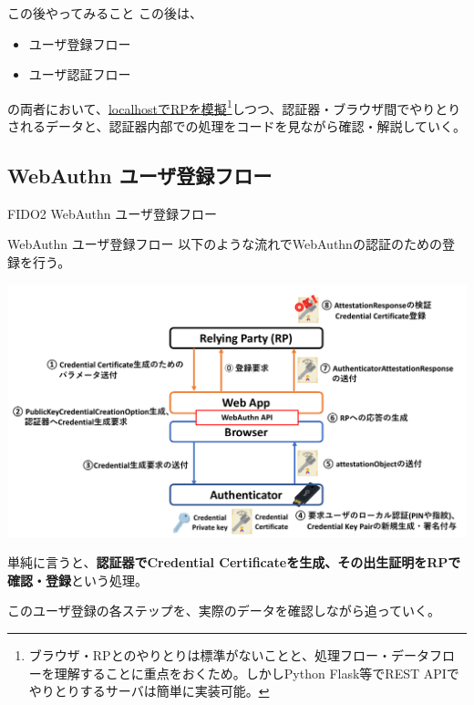\documentclass[12pt,dvipdfmx,uplatex]{beamer}
\begin{document}
\begin{frame}{この後やってみること}
\small
この後は、
\begin{itemize}
 \item ユーザ登録フロー 
 \item ユーザ認証フロー
\end{itemize}
の両者において、\ul{localhostでRPを模擬}\footnote[frame]{\scriptsize ブラウザ・RPとのやりとりは標準がないことと、処理フロー・データフローを理解することに重点をおくため。しかしPython Flask等でREST APIでやりとりするサーバは簡単に実装可能。}しつつ、認証器・ブラウザ間でやりとりされるデータと、認証器内部での処理をコードを見ながら確認・解説していく。
\end{frame}


\subsection{WebAuthn ユーザ登録フロー}

\begin{frame}
\centering
{\Large FIDO2 WebAuthn ユーザ登録フロー}
\end{frame}


\begin{frame}{WebAuthn ユーザ登録フロー}
以下のような流れでWebAuthnの認証のための登録を行う。
\begin{center}
\includegraphics[width=0.9\linewidth]{Figs/webauthn-registration0.pdf}
\end{center}
単純に言うと、\textbf{認証器でCredential Certificateを生成、その出生証明をRPで確認・登録}という処理。

\end{frame}

\begin{frame}
このユーザ登録の各ステップを、実際のデータを確認しながら追っていく。
\end{frame}
\end{document}
